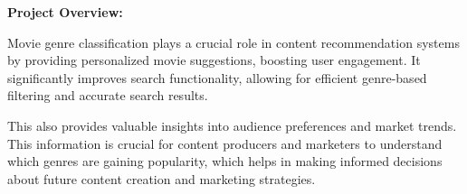 \documentclass[hbrs-poster.tex]{subfiles}
\begin{document}
    {
    
        \textbf{Project Overview:}

        Movie genre classification plays a crucial role in content recommendation systems by providing personalized movie suggestions, boosting user engagement. It significantly improves search functionality, allowing for efficient genre-based filtering and accurate search results. 

        This also provides valuable insights into audience preferences and market trends. This information is crucial for content producers and marketers to understand which genres are gaining popularity, which helps in making informed decisions about future content creation and marketing strategies.\\
        
}
\end{document}

